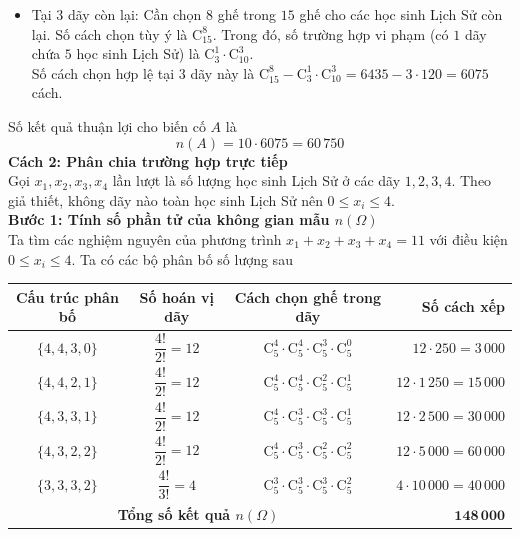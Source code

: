 \begin{ex}
{\begin{itemize}
			\item Tại $3$ dãy còn lại: Cần chọn $8$ ghế trong $15$ ghế cho các học sinh Lịch Sử còn lại. Số cách chọn tùy ý là $\mathrm{C}_{15}^8$. Trong đó, số trường hợp vi phạm (có $1$ dãy chứa $5$ học sinh Lịch Sử) là $\mathrm{C}_3^1 \cdot \mathrm{C}_{10}^3$. \\
			Số cách chọn hợp lệ tại $3$ dãy này là $\mathrm{C}_{15}^8 - \mathrm{C}_3^1 \cdot \mathrm{C}_{10}^3 = 6435 - 3 \cdot 120 = 6075$ cách.
		\end{itemize}
		Số kết quả thuận lợi cho biến cố $A$ là
		$$n(A) = 10 \cdot 6075 = 60\,750$$
		\textbf{Cách 2: Phân chia trường hợp trực tiếp}\\
		Gọi $x_1, x_2, x_3, x_4$ lần lượt là số lượng học sinh Lịch Sử ở các dãy $1, 2, 3, 4$.
		Theo giả thiết, không dãy nào toàn học sinh Lịch Sử nên $0 \le x_i \le 4$.\\
		\textbf{Bước 1: Tính số phần tử của không gian mẫu $n(\Omega)$}\\
		Ta tìm các nghiệm nguyên của phương trình $x_1 + x_2 + x_3 + x_4 = 11$ với điều kiện $0 \le x_i \le 4$. Ta có các bộ phân bố số lượng sau
		\begin{center}
			\renewcommand{\arraystretch}{1.75}
			\begin{tabular}{|c|c|c|r|}
				\hline
				\textbf{Cấu trúc phân bố} & \textbf{Số hoán vị dãy} & \textbf{Cách chọn ghế trong dãy} & \textbf{Số cách xếp} \\ \hline
				$\{4, 4, 3, 0\}$ & $\dfrac{4!}{2!} = 12$ & $\mathrm{C}_5^4 \cdot \mathrm{C}_5^4 \cdot \mathrm{C}_5^3 \cdot \mathrm{C}_5^0$ & $12 \cdot 250 = 3\,000$ \\ \hline
				$\{4, 4, 2, 1\}$ & $\dfrac{4!}{2!} = 12$ & $\mathrm{C}_5^4 \cdot \mathrm{C}_5^4 \cdot \mathrm{C}_5^2 \cdot \mathrm{C}_5^1$ & $12 \cdot 1\,250 = 15\,000$ \\ \hline
				$\{4, 3, 3, 1\}$ & $\dfrac{4!}{2!} = 12$ & $\mathrm{C}_5^4 \cdot \mathrm{C}_5^3 \cdot \mathrm{C}_5^3 \cdot \mathrm{C}_5^1$ & $12 \cdot 2\,500 = 30\,000$ \\ \hline
				$\{4, 3, 2, 2\}$ & $\dfrac{4!}{2!} = 12$ & $\mathrm{C}_5^4 \cdot \mathrm{C}_5^3 \cdot \mathrm{C}_5^2 \cdot \mathrm{C}_5^2$ & $12 \cdot 5\,000 = 60\,000$ \\ \hline
				$\{3, 3, 3, 2\}$ & $\dfrac{4!}{3!} = 4$ & $\mathrm{C}_5^3 \cdot \mathrm{C}_5^3 \cdot \mathrm{C}_5^3 \cdot \mathrm{C}_5^2$ & $4 \cdot 10\,000 = 40\,000$ \\ \hline
				\multicolumn{3}{|c|}{\textbf{Tổng số kết quả $n(\Omega)$}} & $\mathbf{148\,000}$ \\ \hline

\end{tabular}
\end{center}}
\end{ex}
